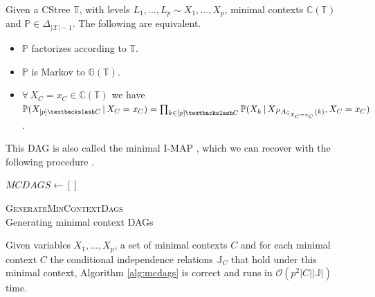 \documentclass{tufte-book}
\begin{document}
\begin{Definition}
\begin{theorem}\label{thm:markovtheoremcstrees}
Given a CStree $\mathbb{T}$, with levels $L_1,...,L_p \sim X_1,...,X_p$, minimal contexts $\mathbb{C}(\mathbb{T})$ and $\mathbb{P} \in \Delta_{|\mathcal{X}|-1}$. The following are equivalent.
\begin{itemize}
\item $\mathbb{P}$ factorizes according to $\mathbb{T}$.
\item $\mathbb{P}$ is Markov to $\mathbb{G}(\mathbb{T})$.
\item $\forall \, X_C = x_C \in \mathbb{C}(\mathbb{T})$ we have\\ $\mathbb{P}(X_{[p]\textbackslash C}\,|\,X_C=x_C) = \prod_{k \in [p]\textbackslash C} \mathbb{P}(X_k \, |\, X_{PA_{\mathbb{G}_{X_C=x_C}}(k)}, X_C=x_C)$.
\end{itemize}
\end{theorem}


This DAG is also called the minimal I-MAP \cite{verma-1990-causal-networ}, which we can recover with the following procedure \cite{solus-2021-consis-guaran}.


\begin{algorithm}\label{alg:mcdags}
\SetAlgoLined
{}
$MCDAGS \gets []$\;

\caption{\textsc{GenerateMinContextDags} \\ Generating minimal context DAGs}
\end{algorithm}


\begin{theorem}\label{thm:mcdagscorrectness}
Given variables $X_1,...,X_p$, a set of minimal contexts $C$ and for each minimal context $C$ the conditional independence relations $\mathbb{J}_C$ that hold under this minimal context, Algorithm \ref{alg:mcdags} is correct and runs in $\mathcal{O}(p^2 |C||\mathbb{J}|)$ time.
\end{theorem}



\end{Definition}
\end{document}
